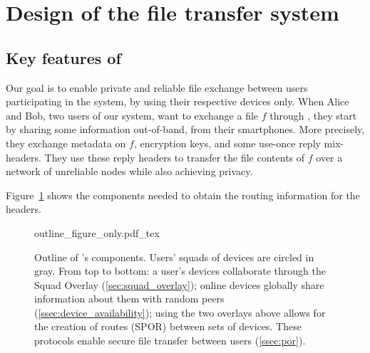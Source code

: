 
\section{Design of the \name file transfer system}%
\label{design}


\subsection{Key features of \name}

Our goal is to enable private and reliable file exchange between users 
participating in the system, by using their respective devices only.
When Alice and Bob, two users of our system, want to exchange a file \(f\) 
through \name, they start by sharing some information out-of-band, \eg from 
their smartphones.
More precisely, they exchange metadata on \(f\), encryption keys, and
some use-once reply mix-headers.
They use these reply headers to transfer the file contents of \(f\) over a 
network of unreliable nodes while also achieving privacy.

Figure~\ref{fig:outline} shows the components needed to obtain the
routing information for the headers.  

\begin{figure}[t]
  \centering
  \def\svgwidth{0.8\columnwidth}
  {outline_figure_only.pdf_tex}
  \caption{\label{fig:outline}%
    Outline of \name's components. Users' squads of devices are circled in gray. 
    From top to bottom: a user's devices collaborate through the Squad Overlay 
    (\cref{sec:squad_overlay}); online devices globally share information about 
    them with random peers (\cref{ssec:device_availability}); using the two 
    overlays above allows for the creation of routes (\ac{SPOR}) between sets of devices. 
    These protocols enable secure file transfer between users 
    (\cref{ssec:por}).}
\end{figure}

